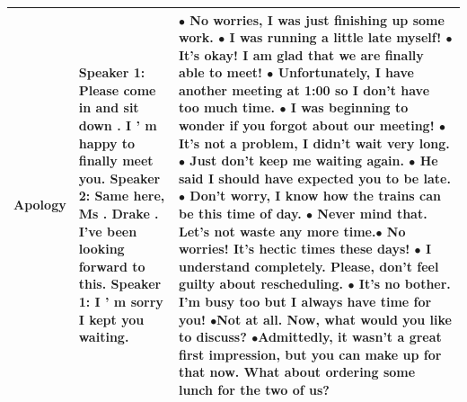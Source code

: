\documentclass[11pt]{article}
\begin{document}
\begin{longtable}{|p{2cm}|p{3cm}|p{10cm}|}
 Apology &  \textbf{Speaker 1:} Please come in and sit down . I ’ m happy to finally meet you. \newline \hspace*{0.5cm} \textbf{Speaker 2:} Same here, Ms . Drake . I've been looking forward to this. \newline \textbf{Speaker 1:} I ’ m sorry I kept you waiting. & $\bullet$ No worries, I was just finishing up some work. \newline $\bullet$ I was running a little late myself! \newline $\bullet$ It's okay! I am glad that we are finally able to meet! \newline $\bullet$ Unfortunately, I have another meeting at 1:00 so I don't have too much time. \newline $\bullet$ I was beginning to wonder if you forgot about our meeting! \newline \newline $\bullet$ It's not a problem, I didn't wait very long. \newline $\bullet$ Just don't keep me waiting again. \newline $\bullet$ He said I should have expected you to be late. \newline $\bullet$ Don't worry, I know how the trains can be this time of day. \newline $\bullet$ Never mind that. Let's not waste any more time.\newline \newline $\bullet$ No worries! It's hectic times these days! \newline $\bullet$ I understand completely. Please, don't feel guilty about rescheduling. \newline $\bullet$ It's no bother. I'm busy too but I always have time for you! \newline $\bullet$Not at all. Now, what would you like to discuss? \newline $\bullet$Admittedly, it wasn't a great first impression, but you can make up for that now. What about ordering some lunch for the two of us?\\\hline

\end{longtable}
\end{document}
